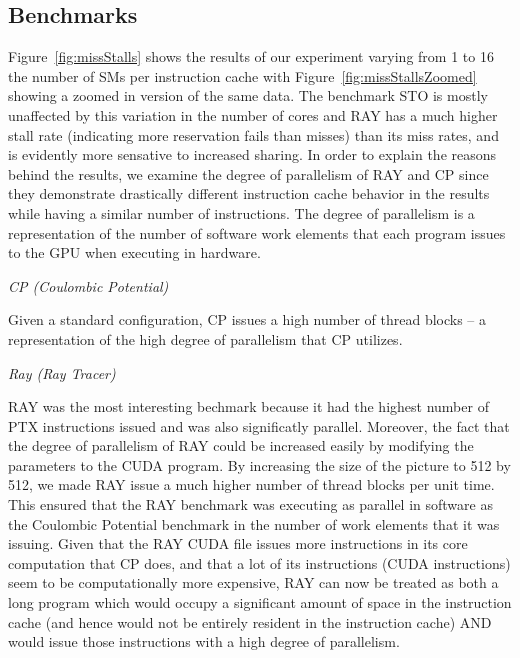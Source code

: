\subsection{Benchmarks}
\label{sec:benchmarks}
Figure~\ref{fig:missStalls} shows the results of our experiment
varying from 1 to 16 the number of SMs per instruction cache with
Figure~\ref{fig:missStallsZoomed} showing a zoomed in version of the
same data.
The benchmark STO is mostly unaffected by this variation in the number
of cores and RAY has a much higher stall rate (indicating more
reservation fails than misses) than its miss rates, and is evidently
more sensative to increased sharing.
In order to explain the reasons behind the results, we examine the
degree of parallelism of RAY and CP since they demonstrate drastically
different instruction cache behavior in the results while having a
similar number of instructions.
The degree of parallelism is a representation of the number of software
work elements that each program issues to the GPU when executing in
hardware. 

\emph{CP (Coulombic Potential)}

Given a standard configuration, CP issues a high number of thread
blocks -- a representation of the high degree of parallelism that CP
utilizes.

\emph{Ray (Ray Tracer)}

RAY was the most interesting bechmark because it had the highest
number of PTX instructions issued and was also significatly parallel. 
Moreover, the fact that the degree of parallelism of RAY could be
increased easily by modifying the parameters to the CUDA program.
By increasing the size of the picture to 512 by 512, we made RAY issue
a much higher number of thread blocks per unit time. 
This ensured that the RAY benchmark was executing as parallel in
software as the Coulombic Potential benchmark in the number of work
elements that it was issuing. 
Given that the RAY CUDA file issues more instructions in its core
computation that CP does, and that a lot of its instructions (CUDA
instructions) seem to be computationally more expensive, RAY can now
be treated as both a long program which would occupy a significant
amount of space in the instruction cache (and hence would not be
entirely resident in the instruction cache) AND would issue those
instructions with a high degree of parallelism.

